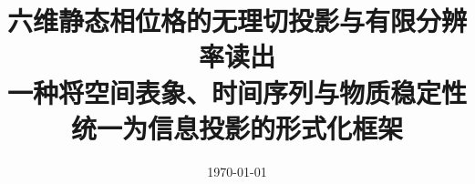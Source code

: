 \documentclass[11pt,letterpaper]{ctexart}
\title{六维静态相位格的无理切投影与有限分辨率读出\\\large 一种将空间表象、时间序列与物质稳定性统一为信息投影的形式化框架}
\author{}
\date{\today}
\begin{document}
\maketitle
















\FloatBarrier
\appendix


\FloatBarrier

\end{document}
